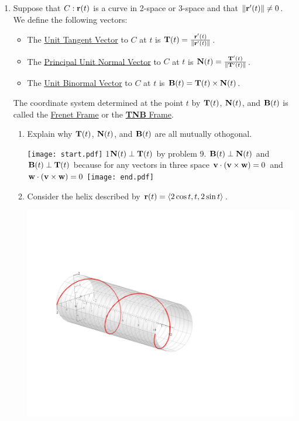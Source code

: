\documentclass[12pt]{article}
\begin{document}
\begin{enumerate}
\item Suppose that $C:{\bf r}(t)$ is a curve in 2-space or 3-space and that $\|{\bf r}^{\prime}(t)\|\neq 0$.  We define the following vectors:
\begin{itemize}

\item The \underline{Unit Tangent Vector} to $C$ at $t$ is ${\bf T}(t)=\frac{{\bf r}^{\prime}(t)}{\|{\bf r}^{\prime}(t)\|}$.

\item The \underline{Principal Unit Normal Vector} to $C$ at $t$ is ${\bf N}(t)=\frac{{\bf T}^{\prime}(t)}{\|{\bf T}^{\prime}(t)\|}$.

\item The \underline{Unit Binormal Vector} to $C$ at $t$ is ${\bf B}(t)={\bf T}(t)\times {\bf N}(t)$.

\end{itemize}

The coordinate system determined at the point $t$ by ${\bf T}(t)$, ${\bf N}(t)$, and ${\bf B}(t)$ is called the \underline{Frenet Frame} or the \underline{{\bf TNB} Frame}.

\begin{enumerate}

\item Explain why ${\bf T}(t)$, ${\bf N}(t)$, and ${\bf B}(t)$ are all mutually othogonal.

\texttt{[image: start.pdf]}
{{{1\linewidth}{${\bf N}(t)\perp {\bf T}(t)$ by problem 9.  ${\bf B}(t) \perp {\bf N}(t)$ and ${\bf B}(t) \perp {\bf T}(t)$ because for any vectors in three space ${\bf v} \cdot ({\bf v}\times{\bf w})=0$ and ${\bf w} \cdot ({\bf v}\times{\bf w})=0$}}}
\texttt{[image: end.pdf]}


\item Consider the helix described by ${\bf r}(t)=\langle 2 \cos{t}, t, 2\sin{t} \rangle$.

\begin{center}
\includegraphics[scale=0.5]{helix.pdf}
\end{center}


\end{enumerate}
\end{enumerate}
\end{document}
